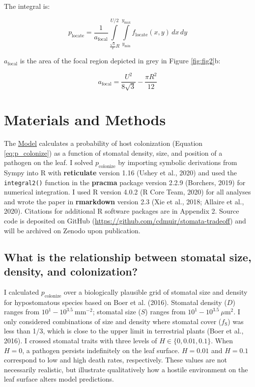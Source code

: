 \documentclass[utf8]{frontiersSCNS}
\newcommand{\fs}{$f_\text{S}$}
\begin{document}
The integral is:

\begin{equation}
  p_\text{locate} = \frac{1}{a_\text{focal}}\int\limits_{\frac{\sqrt{3}}{2} R} ^ {U / 2} \int\limits_{y_\mathrm{min}} ^ {y_\mathrm{max}} f_\text{locate}(x, y) \,dx \,dy
\end{equation}

\(a_\text{focal}\) is the area of the focal region depicted in grey in
Figure \ref{fig:fig2}b:

\[ a_\text{focal} = \frac{U ^ 2}{8 \sqrt{3}} - \frac{\pi R ^ 2}{12} \]

\hypertarget{materials-and-methods}{%
\section*{Materials and Methods}\label{materials-and-methods}}

The \protect\hyperlink{model}{Model} calculates a probability of host
colonization (Equation \ref{eq:p_colonize}) as a function of stomatal
density, size, and position of a pathogen on the leaf. I solved
\(p_\text{colonize}\) by importing symbolic derivations from Sympy into
R with \textbf{reticulate} version 1.16 (Ushey et al., 2020) and used
the \texttt{integral2()} function in the \textbf{pracma} package version
2.2.9 (Borchers, 2019) for numerical integration. I used R version 4.0.2
(R Core Team, 2020) for all analyses and wrote the paper in
\textbf{rmarkdown} version 2.3 (Xie et al., 2018; Allaire et al., 2020).
Citations for additional R software packages are in Appendix 2. Source
code is deposited on GitHub
(\url{https://github.com/cdmuir/stomata-tradeoff}) and will be archived
on Zenodo upon publication.

\hypertarget{what-is-the-relationship-between-stomatal-size-density-and-colonization}{%
\subsection*{What is the relationship between stomatal size, density,
and
colonization?}\label{what-is-the-relationship-between-stomatal-size-density-and-colonization}}

I calculated \(p_\text{colonize}\) over a biologically plausible grid of
stomatal size and density for hypostomatous species based on Boer et al.
(2016). Stomatal density (\(D\)) ranges from
\(10^1 - 10^{3.5}~\text{mm}^{-2}\); stomatal size (\(S\)) ranges from
\(10^1 - 10^{3.5}~\mu\text{m}^2\). I only considered combinations of
size and density where stomatal cover (\fs) was less than 1/3, which is
close to the upper limit in terrestrial plants (Boer et al., 2016). I
crossed stomatal traits with three levels of \(H \in \{0, 0.01, 0.1\}\).
When \(H = 0\), a pathogen persists indefinitely on the leaf surface.
\(H = 0.01\) and \(H = 0.1\) correspond to low and high death rates,
respectively. These values are not necessarily realistic, but illustrate
qualitatively how a hostile environment on the leaf surface alters model
predictions.
\end{document}
